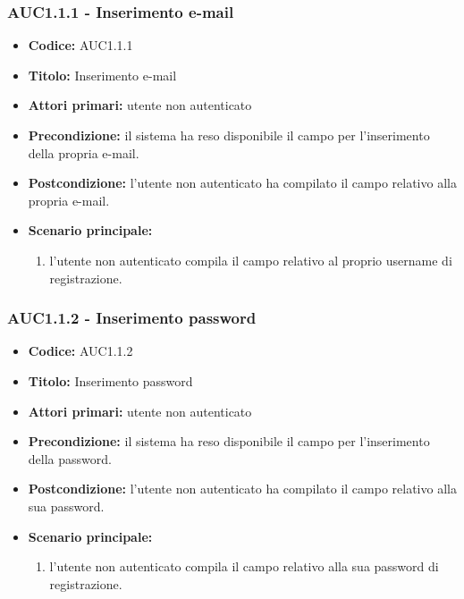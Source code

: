 \documentclass[casi-duso]{subfiles}
\begin{document}
\subsubsection{AUC1.1.1 - Inserimento e-mail}%
\label{subsub:AUC1.1.1}
\begin{itemize}
  \item \textbf{Codice:} AUC1.1.1
  \item \textbf{Titolo:} Inserimento e-mail
  \item \textbf{Attori primari:} utente non autenticato
  \item \textbf{Precondizione:} il sistema ha reso disponibile il campo per l'inserimento della propria e-mail.
  \item \textbf{Postcondizione:} l'utente non autenticato ha compilato il campo relativo alla propria e-mail.
  \item \textbf{Scenario principale:} 
  \begin{enumerate}
    \item l'utente non autenticato compila il campo relativo al proprio username di registrazione.
  \end{enumerate}
\end{itemize}

\subsubsection{AUC1.1.2 - Inserimento password}%
\label{subsub:AUC1.1.2}
\begin{itemize}
  \item \textbf{Codice:} AUC1.1.2
  \item \textbf{Titolo:} Inserimento password
  \item \textbf{Attori primari:} utente non autenticato
  \item \textbf{Precondizione:} il sistema ha reso disponibile il campo per l'inserimento della password.
  \item \textbf{Postcondizione:} l'utente non autenticato ha compilato il campo relativo alla sua password.
  \item \textbf{Scenario principale:}
  \begin{enumerate}
    \item l'utente non autenticato compila il campo relativo alla sua password di registrazione.
  \end{enumerate}
\end{itemize}
\end{document}
